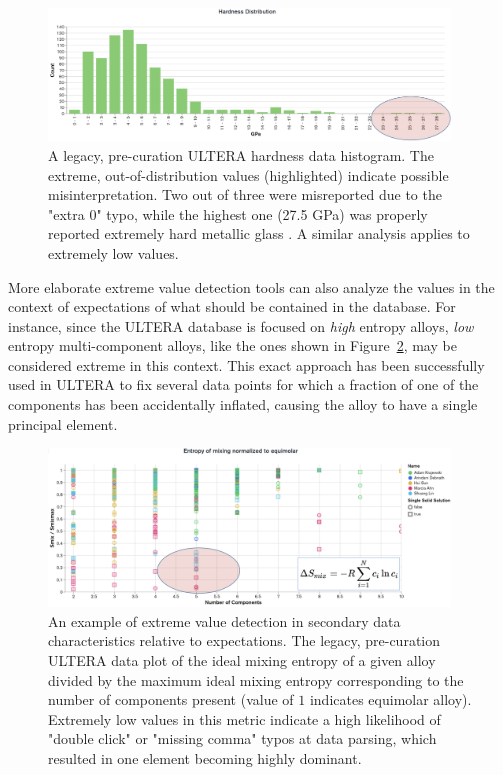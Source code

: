 \begin{figure}[H]
    \centering
    \includegraphics[width=0.95\textwidth]{pyqalloy/pyqalloy_extremevalues.png}
    \caption{A legacy, pre-curation ULTERA hardness data histogram. The extreme, out-of-distribution values (highlighted) indicate possible misinterpretation. Two out of three were misreported due to the "extra 0" typo, while the highest one (27.5 GPa) was properly reported  extremely hard metallic glass \cite{Kim2016DevelopmentRatios}. A similar analysis applies to extremely low values.}
    \label{pyqalloy:fig:extreme}
\end{figure}

More elaborate extreme value detection tools can also analyze the values in the context of expectations of what should be contained in the database. For instance, since the ULTERA database is focused on \emph{high} entropy alloys, \emph{low} entropy multi-component alloys, like the ones shown in Figure~\ref{pyqalloy:fig:lowentropy}, may be considered extreme in this context. This exact approach has been successfully used in ULTERA to fix several data points for which a fraction of one of the components has been accidentally inflated, causing the alloy to have a single principal element.

\begin{figure}[H]
    \centering
    \includegraphics[width=0.95\textwidth]{pyqalloy/pyqalloy_entropy.png}
    \caption{An example of extreme value detection in secondary data characteristics relative to expectations. The legacy, pre-curation ULTERA data plot of the ideal mixing entropy of a given alloy divided by the maximum ideal mixing entropy corresponding to the number of components present (value of $1$ indicates equimolar alloy). Extremely low values in this metric indicate a high likelihood of "double click" or "missing comma" typos at data parsing, which resulted in one element becoming highly dominant.}
    \label{pyqalloy:fig:lowentropy}
\end{figure}


